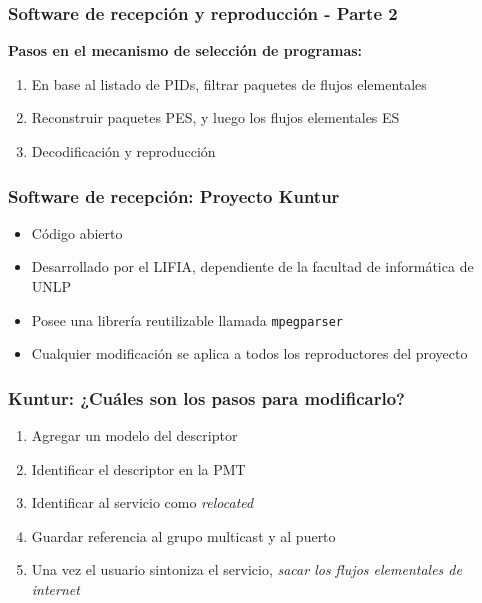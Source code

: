 \documentclass[a4paper,11pt]{beamer}
\newcounter{saveenumi}
\newcommand{\conti}{\setcounter{enumi}{\value{saveenumi}}}
\begin{document}

\begin{frame}
\frametitle{Software de recepción y reproducción - Parte 2}
\textbf{Pasos en el mecanismo de selección de programas:}
\begin{enumerate}
\conti
\item En base al listado de PIDs, filtrar paquetes de flujos elementales
\item Reconstruir paquetes PES, y luego los flujos elementales ES
\item Decodificación y reproducción
\end{enumerate}
\end{frame}


\begin{frame}
\frametitle{Software de recepción: Proyecto Kuntur}
\begin{itemize}
\item Código abierto
\item Desarrollado por el LIFIA, dependiente de la facultad de informática de UNLP
\item Posee una librería reutilizable llamada \texttt{mpegparser}
\item Cualquier modificación se aplica a todos los reproductores del proyecto
\end{itemize}
\end{frame}


\begin{frame}
\frametitle{Kuntur: ¿Cuáles son los pasos para modificarlo?}
\begin{enumerate}
\item Agregar un modelo del descriptor
\item Identificar el descriptor en la PMT
\item Identificar al servicio como \emph{relocated}
\item Guardar referencia al grupo multicast y al puerto\\
\hrulefill
\item Una vez el usuario sintoniza el servicio, \emph{sacar los flujos elementales de internet}
\end{enumerate}
\end{frame}

\end{document}
